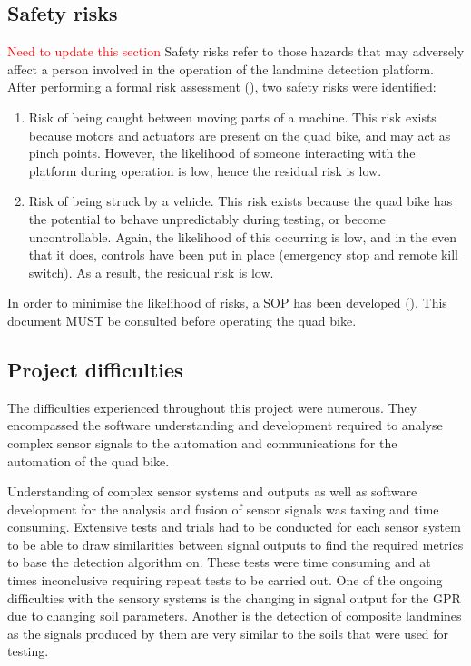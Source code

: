 \documentclass[main.tex]{subfiles}
\begin{document}
\subsection{Safety risks}
\textcolor{red}{Need to update this section}
Safety risks refer to those hazards that may adversely affect a person involved in the operation of the landmine detection platform. After performing a formal risk assessment (), two safety risks were identified:
\begin{enumerate}
\item Risk of being caught between moving parts of a machine. This risk exists because motors and actuators are present on the quad bike, and may act as pinch points. However, the likelihood of someone interacting with the platform during operation is low, hence the residual risk is low.
\item Risk of being struck by a vehicle. This risk exists because the quad bike has the potential to behave unpredictably during testing, or become uncontrollable. Again, the likelihood of this occurring is low, and in the even that it does, controls have been put in place (emergency stop and remote kill switch). As a result, the residual risk is low.
\end{enumerate}
In order to minimise the likelihood of risks, a SOP has been developed (). This document MUST be consulted before operating the quad bike. 
% 

\subsection{Project difficulties}%
The difficulties experienced throughout this project were numerous. They encompassed the software understanding and development required to analyse complex sensor signals to the automation and communications for the automation of the quad bike. 

Understanding of complex sensor systems and outputs as well as software development for the analysis and fusion of sensor signals was taxing and time consuming. Extensive tests and trials had to be conducted for each sensor system to be able to draw similarities between signal outputs to find the required metrics to base the detection algorithm on. These tests were time consuming and at times inconclusive requiring repeat tests to be carried out. One of the ongoing difficulties with the sensory systems is the changing in signal output for the GPR due to changing soil parameters. Another is the detection of composite landmines as the signals produced by them are very similar to the soils that were used for testing. 
\end{document}
